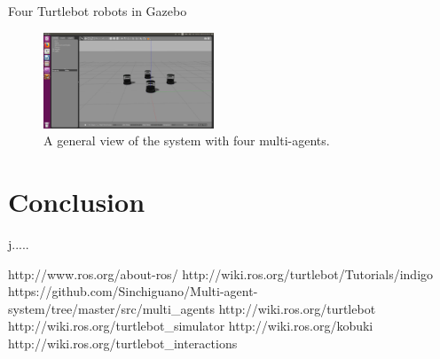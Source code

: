 \documentclass[journal]{IEEEtran}
\begin{document}
\begin{enumerate}
\begin{enumerate}
 

Four Turtlebot robots in Gazebo




\begin{figure}[!h]
\begin{center}
\includegraphics[width=2in]{three.png}
\caption{A general view of the system with four multi-agents.}
\end{center}
\label{fig:mypicture4}
\end{figure}





\end{enumerate}

\end{enumerate}






\section{Conclusion}
j.....



\begin{thebibliography}{1}

http://www.ros.org/about-ros/
http://wiki.ros.org/turtlebot/Tutorials/indigo
https://github.com/Sinchiguano/Multi-agent-system/tree/master/src/multi{\_}agents
http://wiki.ros.org/turtlebot
http://wiki.ros.org/turtlebot{\_}simulator
http://wiki.ros.org/kobuki
http://wiki.ros.org/turtlebot{\_}interactions


\end{thebibliography}
\end{document}
